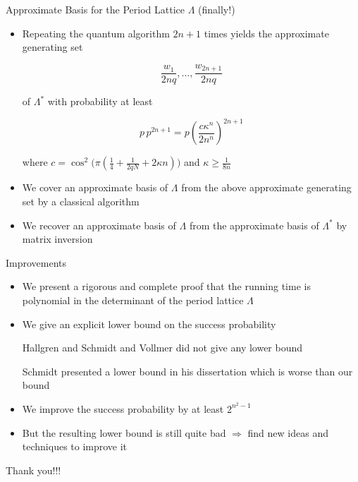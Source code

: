 \documentclass{beamer}
\renewcommand{\>}{\rangle}
\newcommand{\<}{\langle}
\begin{document}

\begin{frame}{Approximate Basis for the Period Lattice $\Lambda$ (finally!)}

\begin{itemize}

\item Repeating the quantum algorithm $2n+1$ times yields the approximate generating set 

\[
	\frac{w_1}{2nq},\ldots,\frac{w_{2n+1}}{2nq} 
\]  

of $\Lambda^*$ with probability at least

\[
	p \, p^{2n+1} = p \left( \frac{c\kappa^n}{2 n^n} \right)^{2n+1} 
\]

where $c=\cos^2\big( \pi ( \tfrac{1}{4} + \tfrac{1}{2qN} + 2\kappa n) \big)$ and $\kappa \ge \tfrac{1}{8n}$

\medskip
\item We cover an approximate basis of $\Lambda$ from the above approximate generating set by a classical algorithm

\medskip
\item We recover an approximate basis of $\Lambda$ from the approximate basis of $\Lambda^*$ by matrix inversion
\end{itemize}


\end{frame}


\begin{frame}{Improvements}

\vspace{-0.2cm}
\begin{itemize}

\item We present a rigorous and complete proof that the running time is polynomial in the determinant of the period lattice $\Lambda$

\medskip
\item We give an explicit lower bound on the success probability 

\medskip
{\sc Hallgren} and {\sc Schmidt and Vollmer} did not give any lower bound

\medskip
{\sc Schmidt} presented a lower bound in his dissertation which is worse than our bound  

\medskip
\item We improve the success probability by at least $2^{n^2-1}$

\medskip
\item But the resulting lower bound is still quite bad $\Rightarrow$ find new ideas and techniques to improve it

\medskip

\end{itemize}

\end{frame}

\begin{frame}{Thank you!!!}

\end{frame}
\end{document}
